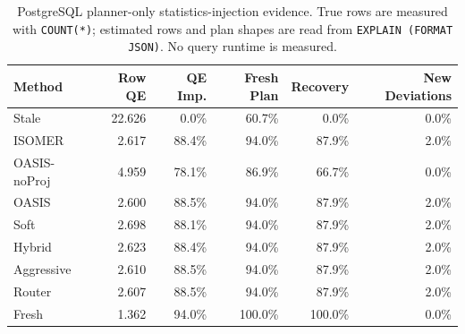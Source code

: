 \begin{table}[t]
  \centering
  \small
  \caption{PostgreSQL planner-only statistics-injection evidence. True rows are measured with \texttt{COUNT(*)}; estimated rows and plan shapes are read from \texttt{EXPLAIN (FORMAT JSON)}. No query runtime is measured.}
  \label{tab:postgres_planner_stats_injection}
  \setlength{\tabcolsep}{4pt}
  \begin{tabular}{lrrrrr}
    \toprule
    Method & Row QE & QE Imp. & Fresh Plan & Recovery & New Deviations \\
    \midrule
    Stale & 22.626 & 0.0\% & 60.7\% & 0.0\% & 0.0\% \\
    ISOMER & 2.617 & 88.4\% & 94.0\% & 87.9\% & 2.0\% \\
    OASIS-noProj & 4.959 & 78.1\% & 86.9\% & 66.7\% & 0.0\% \\
    OASIS & 2.600 & 88.5\% & 94.0\% & 87.9\% & 2.0\% \\
    Soft & 2.698 & 88.1\% & 94.0\% & 87.9\% & 2.0\% \\
    Hybrid & 2.623 & 88.4\% & 94.0\% & 87.9\% & 2.0\% \\
    Aggressive & 2.610 & 88.5\% & 94.0\% & 87.9\% & 2.0\% \\
    Router & 2.607 & 88.5\% & 94.0\% & 87.9\% & 2.0\% \\
    Fresh & 1.362 & 94.0\% & 100.0\% & 100.0\% & 0.0\% \\
    \bottomrule
  \end{tabular}
\end{table}
